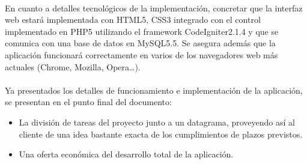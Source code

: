 \paragraph{} En cuanto a detalles tecnológicos de la implementación, concretar que la interfaz web estará implementada con HTML5, CSS3 integrado con el control implementado en PHP5 utilizando el framework CodeIgniter2.1.4 y que se comunica con una base de datos en MySQL5.5. Se asegura además que la aplicación funcionará correctamente en varios de los navegadores web más actuales (Chrome, Mozilla, Opera…).
\paragraph{} Ya presentados los detalles de funcionamiento e implementación de la aplicación, se presentan en el punto final del documento:
\begin{itemize}
\item La división de tareas del proyecto junto a un datagrama, proveyendo así al cliente de una idea bastante exacta de los cumplimientos de plazos previstos.
\item Una oferta económica del desarrollo total de la aplicación.
\end{itemize}